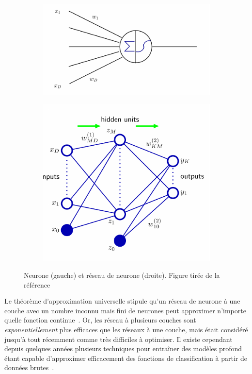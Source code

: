 \begin{figure}[h]
  \centering
  \begin{subfigure}{.5\textwidth}
    \includegraphics[width=\textwidth]{neuron.pdf}
    \label{fig:sub1}
  \end{subfigure}%
  \begin{subfigure}{.5\textwidth}
    \includegraphics[width=\textwidth]{NN.pdf}
    \label{fig:sub2}
  \end{subfigure}
  \caption{Neurone (gauche) et réseau de neurone (droite). Figure tirée de la référence~\cite{bishop_pattern_2006}}
  \label{fig:nn}
\end{figure}

Le théorème d'approximation universelle stipule qu'un réseau de
neurone à une couche avec un nombre inconnu mais fini de neurones
peut approximer n'importe quelle fonction
continue~\cite{hornik_approximation_1991}. Or, les réseau à plusieurs
couches sont \emph{exponentiellement} plus efficaces que les réseaux à
une couche, mais était considéré jusqu'à tout récemment comme très
difficiles à optimiser. Il existe cependant depuis quelques années
plusieurs techniques pour entraîner des modèles profond étant capable
d'approximer efficacement des fonctions de classification à partir de
données brutes~\cite{lecun_deep_2015}.

